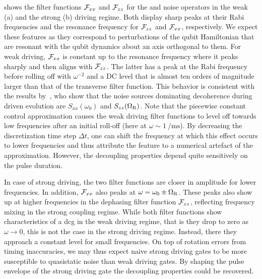  shows the filter functions $\mathcal{F}_{xx}$ and $\mathcal{F}_{zz}$ for the \sx and \sz noise operators in the weak (a) and the strong (b) driving regime.
Both display sharp peaks at their Rabi frequencies and the resonance frequency for $\mathcal{F}_{zz}$ and $\mathcal{F}_{xx}$, respectively.
We expect these features as they correspond to perturbations of the qubit Hamiltonian that are resonant with the qubit dynamics about an axis orthogonal to them.
For weak driving, $\mathcal{F}_{xx}$ is constant up to the resonance frequency where it peaks sharply and then aligns with $\mathcal{F}_{zz}$.
The latter has a peak at the Rabi frequency before rolling off with $\omega^{-2}$ and a DC level that is almost ten orders of magnitude larger than that of the transverse filter function.
This behavior is consistent with the results by~\citet{Yan2013}, who show that the noise sources dominating decoherence during driven evolution are $S_{xx}(\omega_0)$ and $S_{zz}(\Omega_{\mathrm{R}})$.
Note that the piecewise constant control approximation causes the weak driving filter functions to level off towards low frequencies after an initial roll-off (here at $\omega\sim\qty{1}{\per\milli\second}$).
By decreasing the discretization time step $\Delta t$, one can shift the frequency at which this effect occurs to lower frequencies and thus attribute the feature to a numerical artefact of the approximation.
However, the decoupling properties depend quite sensitively on the pulse duration.

In case of strong driving, the two filter functions are closer in amplitude for lower frequencies.
In addition, $\mathcal{F}_{xx}$ also peaks at $\omega = \omega_0\pm\Omega_{\mathrm{R}}$.
These peaks also show up at higher frequencies in the dephasing filter function $\mathcal{F}_{zz}$, reflecting frequency mixing in the strong coupling regime.
While both filter functions show characteristics of a \gls{dcg} in the weak driving regime, that is they drop to zero as $\omega\rightarrow 0$, this is not the case in the strong driving regime.
Instead, there they approach a constant level for small frequencies.
On top of rotation errors from timing inaccuracies, we may thus expect naive strong driving gates to be more susceptible to quasistatic noise than weak driving gates.
By shaping the pulse envelope of the strong driving gate the decoupling properties could be recovered.

